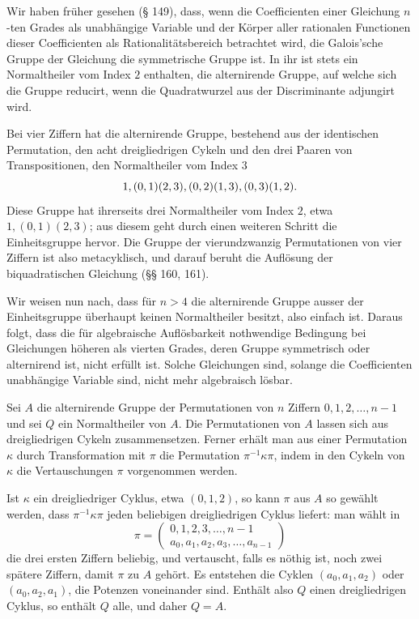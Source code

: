\documentclass[11pt]{article}
\providecommand{\perm}[2]{\begin{pmatrix}#1\\#2\end{pmatrix}}
\begin{document}
Wir haben früher gesehen (§ 149), dass, wenn die Coefficienten einer Gleichung $n$-ten Grades als unabhängige Variable und der Körper aller rationalen Functionen dieser Coefficienten als Rationalitätsbereich betrachtet wird, die Galois'sche Gruppe der Gleichung die symmetrische Gruppe ist. In ihr ist stets ein Normaltheiler vom Index $2$ enthalten, die alternirende Gruppe, auf welche sich die Gruppe reducirt, wenn die Quadratwurzel aus der Discriminante adjungirt wird.

Bei vier Ziffern hat die alternirende Gruppe, bestehend aus der identischen Permutation, den acht dreigliedrigen Cykeln und den drei Paaren von Transpositionen, den Normaltheiler vom Index $3$
\[
  1,\\ (0,1)(2,3),\\ (0,2)(1,3),\\ (0,3)(1,2).
\]
Diese Gruppe hat ihrerseits drei Normaltheiler vom Index $2$, etwa $1,(0,1)(2,3)$; aus diesem geht durch einen weiteren Schritt die Einheitsgruppe hervor. Die Gruppe der vierundzwanzig Permutationen von vier Ziffern ist also metacyklisch, und darauf beruht die Auflösung der biquadratischen Gleichung (§§ 160, 161).

Wir weisen nun nach, dass für $n>4$ die alternirende Gruppe ausser der Einheitsgruppe überhaupt keinen Normaltheiler besitzt, also einfach ist. Daraus folgt, dass die für algebraische Auflösbarkeit nothwendige Bedingung bei Gleichungen höheren als vierten Grades, deren Gruppe symmetrisch oder alternirend ist, nicht erfüllt ist. Solche Gleichungen sind, solange die Coefficienten unabhängige Variable sind, nicht mehr algebraisch lösbar.

Sei $A$ die alternirende Gruppe der Permutationen von $n$ Ziffern $0,1,2,\ldots,n-1$ und sei $Q$ ein Normaltheiler von $A$. Die Permutationen von $A$ lassen sich aus dreigliedrigen Cykeln zusammensetzen. Ferner erhält man aus einer Permutation $\kappa$ durch Transformation mit $\pi$ die Permutation $\pi^{-1}\kappa\pi$, indem in den Cykeln von $\kappa$ die Vertauschungen $\pi$ vorgenommen werden.

Ist $\kappa$ ein dreigliedriger Cyklus, etwa $(0,1,2)$, so kann $\pi$ aus $A$ so gewählt werden, dass $\pi^{-1}\kappa\pi$ jeden beliebigen dreigliedrigen Cyklus liefert: man wählt in
\[
  \pi=\perm{0,1,2,3,\ldots,n-1}{a_0,a_1,a_2,a_3,\ldots,a_{n-1}}
\]
die drei ersten Ziffern beliebig, und vertauscht, falls es nöthig ist, noch zwei spätere Ziffern, damit $\pi$ zu $A$ gehört. Es entstehen die Cyklen $(a_0,a_1,a_2)$ oder $(a_0,a_2,a_1)$, die Potenzen voneinander sind. Enthält also $Q$ einen dreigliedrigen Cyklus, so enthält $Q$ alle, und daher $Q=A$.
\end{document}
